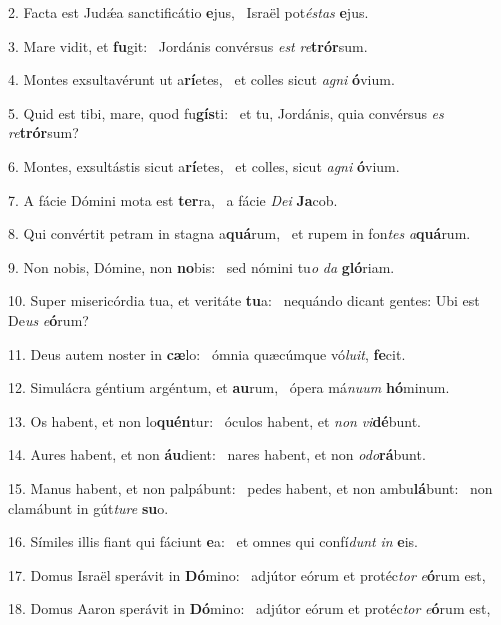 2. Facta est Judǽa sanctificátio \textbf{e}jus, \ast\  Israël pot\textit{és}\textit{tas} \textbf{e}jus.\

3. Mare vidit, et \textbf{fu}git: \ast\  Jordánis convérsus \textit{est} \textit{re}\textbf{trór}sum.\

4. Montes exsultavérunt ut a\textbf{rí}etes, \ast\  et colles sicut \textit{a}\textit{gni} \textbf{ó}vium.\

5. Quid est tibi, mare, quod fu\textbf{gís}ti: \ast\  et tu, Jordánis, quia convérsus \textit{es} \textit{re}\textbf{trór}sum?\

6. Montes, exsultástis sicut a\textbf{rí}etes, \ast\  et colles, sicut \textit{a}\textit{gni} \textbf{ó}vium.\

7. A fácie Dómini mota est \textbf{ter}ra, \ast\  a fácie \textit{De}\textit{i} \textbf{Ja}cob.\

8. Qui convértit petram in stagna a\textbf{quá}rum, \ast\  et rupem in fon\textit{tes} \textit{a}\textbf{quá}rum.\

9. Non nobis, Dómine, non \textbf{no}bis: \ast\  sed nómini tu\textit{o} \textit{da} \textbf{gló}riam.\

10. Super misericórdia tua, et veritáte \textbf{tu}a: \ast\  nequándo dicant gentes: Ubi est De\textit{us} \textit{e}\textbf{ó}rum?\

11. Deus autem noster in \textbf{cæ}lo: \ast\  ómnia quæcúmque vó\textit{lu}\textit{it}, \textbf{fe}cit.\

12. Simulácra géntium argéntum, et \textbf{au}rum, \ast\  ópera má\textit{nu}\textit{um} \textbf{hó}minum.\

13. Os habent, et non lo\textbf{quén}tur: \ast\  óculos habent, et \textit{non} \textit{vi}\textbf{dé}bunt.\

14. Aures habent, et non \textbf{áu}dient: \ast\  nares habent, et non \textit{o}\textit{do}\textbf{rá}bunt.\

15. Manus habent, et non palpábunt: \dag\  pedes habent, et non ambu\textbf{lá}bunt: \ast\  non clamábunt in gút\textit{tu}\textit{re} \textbf{su}o.\

16. Símiles illis fiant qui fáciunt \textbf{e}a: \ast\  et omnes qui confí\textit{dunt} \textit{in} \textbf{e}is.\

17. Domus Israël sperávit in \textbf{Dó}mino: \ast\  adjútor eórum et protéc\textit{tor} \textit{e}\textbf{ó}rum est,\

18. Domus Aaron sperávit in \textbf{Dó}mino: \ast\  adjútor eórum et protéc\textit{tor} \textit{e}\textbf{ó}rum est,\

